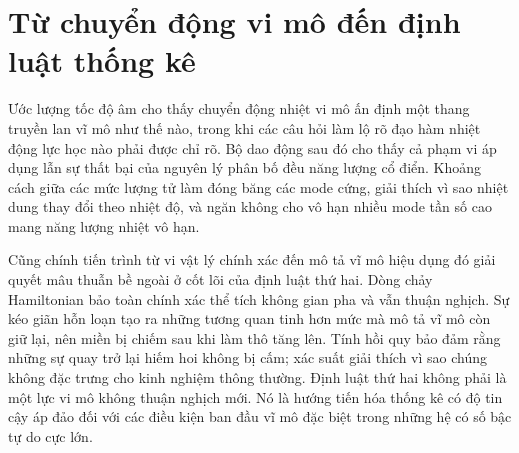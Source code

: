 \begin{classroomqa}
\end{classroomqa}

\begin{classroomqa}
\end{classroomqa}

\begin{classroomqa}
\end{classroomqa}

\section{Từ chuyển động vi mô đến định luật thống kê}

Ước lượng tốc độ âm cho thấy chuyển động nhiệt vi mô ấn định một thang truyền lan vĩ mô như thế nào, trong khi các câu hỏi làm lộ rõ đạo hàm nhiệt động lực học nào phải được chỉ rõ. Bộ dao động sau đó cho thấy cả phạm vi áp dụng lẫn sự thất bại của nguyên lý phân bố đều năng lượng cổ điển. Khoảng cách giữa các mức lượng tử làm đóng băng các mode cứng, giải thích vì sao nhiệt dung thay đổi theo nhiệt độ, và ngăn không cho vô hạn nhiều mode tần số cao mang năng lượng nhiệt vô hạn.

Cũng chính tiến trình từ vi vật lý chính xác đến mô tả vĩ mô hiệu dụng đó giải quyết mâu thuẫn bề ngoài ở cốt lõi của định luật thứ hai. Dòng chảy Hamiltonian bảo toàn chính xác thể tích không gian pha và vẫn thuận nghịch. Sự kéo giãn hỗn loạn tạo ra những tương quan tinh hơn mức mà mô tả vĩ mô còn giữ lại, nên miền bị chiếm sau khi làm thô tăng lên. Tính hồi quy bảo đảm rằng những sự quay trở lại hiếm hoi không bị cấm; xác suất giải thích vì sao chúng không đặc trưng cho kinh nghiệm thông thường. Định luật thứ hai không phải là một lực vi mô không thuận nghịch mới. Nó là hướng tiến hóa thống kê có độ tin cậy áp đảo đối với các điều kiện ban đầu vĩ mô đặc biệt trong những hệ có số bậc tự do cực lớn.